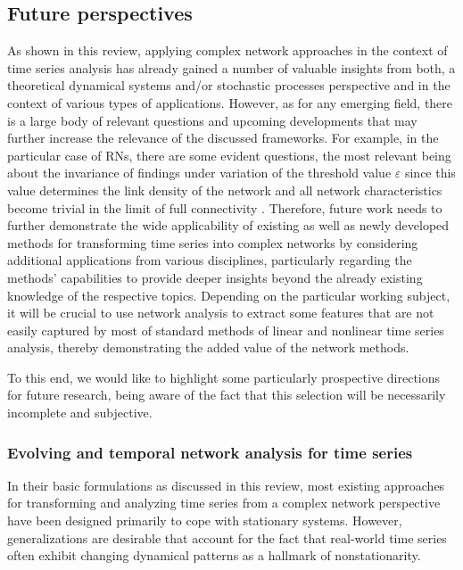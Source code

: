 	\subsection{Future perspectives}
	As shown in this review, applying complex network approaches in the context of time series analysis has already gained a number of valuable insights from both, a theoretical dynamical systems and/or stochastic processes perspective and in the context of various types of applications. However, as for any emerging field, there is a large body of relevant questions and upcoming developments that may further increase the relevance of the discussed frameworks. For example, in the particular case of RNs, there are some evident questions, the most relevant being about the invariance of findings under variation of the threshold value $\varepsilon$ since this value determines the link density of the network and all network characteristics become trivial in the limit of full connectivity \cite{Bradley2015c}. Therefore, future work needs to further demonstrate the wide applicability of existing as well as newly developed methods for transforming time series into complex networks by considering additional applications from various disciplines, particularly regarding the methods' capabilities to provide deeper insights beyond the already existing knowledge of the respective topics. Depending on the particular working subject, it will be crucial to use network analysis to extract some features that are not easily captured by most of standard methods of linear and nonlinear time series analysis, thereby demonstrating the added value of the network methods.

	To this end, we would like to highlight some particularly prospective directions for future research, being aware of the fact that this selection will be necessarily incomplete and subjective.

\subsubsection{Evolving and temporal network analysis for time series}

In their basic formulations as discussed in this review, most existing approaches for transforming and analyzing time series from a complex network perspective have been designed primarily to cope with stationary systems. However, generalizations are desirable that account for the fact that real-world time series often exhibit changing dynamical patterns as a hallmark of nonstationarity.

